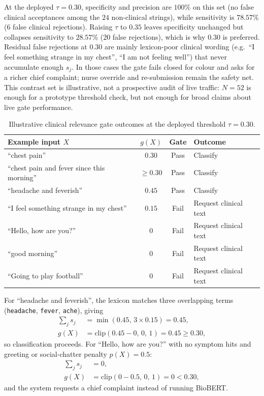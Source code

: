 At the deployed \(\tau=0.30\), specificity and precision are \(100\%\) on this set (no false clinical acceptances among the \(24\) non-clinical strings), while sensitivity is \(78.57\%\) (\(6\) false clinical rejections). Raising \(\tau\) to \(0.35\) leaves specificity unchanged but collapses sensitivity to \(28.57\%\) (\(20\) false rejections), which is why \(0.30\) is preferred. Residual false rejections at \(0.30\) are mainly lexicon-poor clinical wording (e.g.\ ``I feel something strange in my chest'', ``I am not feeling well'') that never accumulate enough \(s_j\). In those cases the gate fails closed for colour and asks for a richer chief complaint; nurse override and re-submission remain the safety net. This contrast set is illustrative, not a prospective audit of live \examplehospital{} traffic: \(N=52\) is enough for a prototype threshold check, but not enough for broad claims about live gate performance.

\begin{table}[H]
\centering
\small
\begin{tabular}{|p{5.4cm}|c|c|l|}
\hline
\textbf{Example input \(X\)} & \(g(X)\) & Gate & Outcome \\
\hline
``chest pain'' & \(0.30\) & Pass & Classify \\
``chest pain and fever since this morning'' & \(\geq 0.30\) & Pass & Classify \\
``headache and feverish'' & \(0.45\) & Pass & Classify \\
``I feel something strange in my chest'' & \(0.15\) & Fail & Request clinical text \\
``Hello, how are you?'' & \(0\) & Fail & Request clinical text \\
``good morning'' & \(0\) & Fail & Request clinical text \\
``Going to play football'' & \(0\) & Fail & Request clinical text \\
\hline
\end{tabular}
\caption{Illustrative clinical relevance gate outcomes at the deployed threshold \(\tau=0.30\).}
\label{tab:gate-calibration}
\end{table}

\begin{example}
For ``headache and feverish'', the lexicon matches three overlapping terms (\texttt{headache}, \texttt{fever}, \texttt{ache}), giving
\begin{align*}
  \sum_j s_j &= \min(0.45,\, 3\times 0.15) = 0.45, \\
  g(X) &= \mathrm{clip}(0.45 - 0,\, 0,\, 1) = 0.45 \geq 0.30,
\end{align*}
so classification proceeds. For ``Hello, how are you?'' with no symptom hits and greeting or social-chatter penalty \(p(X)=0.5\):
\begin{align*}
  \sum_j s_j &= 0, \\
  g(X) &= \mathrm{clip}(0 - 0.5,\, 0,\, 1) = 0 < 0.30,
\end{align*}
and the system requests a chief complaint instead of running BioBERT.
\end{example}

